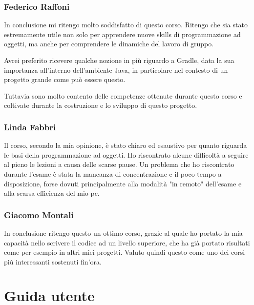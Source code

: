 \documentclass[a4paper,12pt]{report}
\begin{document}
\subsection{Federico Raffoni}
In conclusione mi ritengo molto soddisfatto di questo corso. Ritengo che sia stato estremamente utile non solo per apprendere nuove skills di programmazione ad oggetti, ma anche per comprendere le dinamiche del lavoro di gruppo.

Avrei preferito ricevere qualche nozione in più riguardo a Gradle, data la sua importanza all’interno dell’ambiente Java, in particolare nel contesto di un progetto grande come può essere questo.

Tuttavia sono molto contento delle competenze ottenute durante questo corso e coltivate durante la costruzione e lo sviluppo di questo progetto.

\subsection{Linda Fabbri}
Il corso, secondo la mia opinione, è stato chiaro ed esaustivo per quanto riguarda le basi della programmazione ad oggetti.
Ho riscontrato alcune difficoltà a seguire al pieno le lezioni a causa delle scarse pause.
Un problema che ho riscontrato durante l'esame è stata la mancanza di concentrazione e il poco tempo a disposizione, forse dovuti principalmente alla modalità "in remoto" dell'esame e alla scarsa efficienza del mio pc.


\subsection{Giacomo Montali}
In conclusione ritengo questo un ottimo corso, grazie al quale ho portato la mia capacità nello scrivere il codice ad un livello superiore, che ha già portato risultati come per esempio in altri miei progetti.
Valuto quindi questo come uno dei corsi più interessanti sostenuti fin'ora.

\appendix
\chapter{Guida utente}
\end{document}
